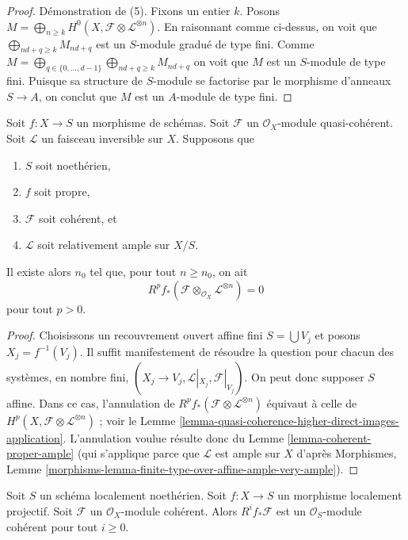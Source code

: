 \begin{proof}
\medskip\noindent
Démonstration de (5). Fixons un entier $k$. Posons
$M = \bigoplus_{n \geq k} H^0(X, \mathcal{F} \otimes \mathcal{L}^{\otimes n})$.
En raisonnant comme ci-dessus, on voit que
$\bigoplus_{nd + q \geq k} M_{nd + q}$ est un $S$-module gradué de type fini.
Comme
$M = \bigoplus_{q \in \{0, \ldots, d - 1\}}
\bigoplus_{nd + q \geq k} M_{nd + q}$
on voit que $M$ est un $S$-module de type fini. Puisque sa structure de
$S$-module se factorise par le morphisme d'anneaux $S \to A$, on conclut que
$M$ est un $A$-module de type fini.
\end{proof}

\begin{lemma}
\label{lemma-kill-by-twisting}
Soit $f : X \to S$ un morphisme de schémas.
Soit $\mathcal{F}$ un $\mathcal{O}_X$-module quasi-cohérent.
Soit $\mathcal{L}$ un faisceau inversible sur $X$.
Supposons que
\begin{enumerate}
\item $S$ soit noethérien,
\item $f$ soit propre,
\item $\mathcal{F}$ soit cohérent, et
\item $\mathcal{L}$ soit relativement ample sur $X/S$.
\end{enumerate}
Il existe alors $n_0$ tel que, pour tout $n \geq n_0$, on ait
$$
R^pf_*\left(\mathcal{F} \otimes_{\mathcal{O}_X} \mathcal{L}^{\otimes n}\right)
=
0
$$
pour tout $p > 0$.
\end{lemma}

\begin{proof}
Choisissons un recouvrement ouvert affine fini $S = \bigcup V_j$ et posons
$X_j = f^{-1}(V_j)$.
Il suffit manifestement de résoudre la question pour chacun des systèmes, en
nombre fini, $(X_j \to V_j, \mathcal{L}|_{X_j}, \mathcal{F}|_{V_j})$.
On peut donc supposer $S$ affine. Dans ce cas, l'annulation de
$R^pf_*(\mathcal{F} \otimes \mathcal{L}^{\otimes n})$
équivaut à celle de $H^p(X, \mathcal{F} \otimes \mathcal{L}^{\otimes n})$ ;
voir le Lemme \ref{lemma-quasi-coherence-higher-direct-images-application}.
L'annulation voulue résulte donc du Lemme
\ref{lemma-coherent-proper-ample} (qui s'applique parce que $\mathcal{L}$ est
ample sur $X$ d'après Morphismes, Lemme
\ref{morphisms-lemma-finite-type-over-affine-ample-very-ample}).
\end{proof}

\begin{lemma}
\label{lemma-locally-projective-pushforward}
Soit $S$ un schéma localement noethérien.
Soit $f : X \to S$ un morphisme localement projectif.
Soit $\mathcal{F}$ un $\mathcal{O}_X$-module cohérent.
Alors $R^if_*\mathcal{F}$ est un $\mathcal{O}_S$-module cohérent pour tout
$i \geq 0$.
\end{lemma}

